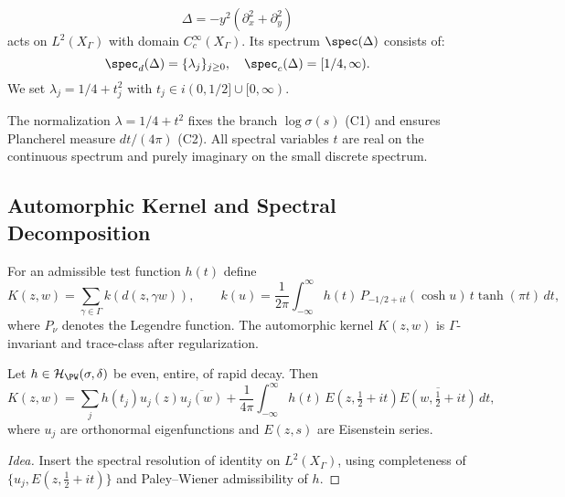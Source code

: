 \begin{definition}\label{def:laplace}\relax
\[
\Delta=-y^2(\partial_x^2+\partial_y^2)
\]
acts on $L^2(X_\Gamma)$ with domain $C_c^\infty(X_\Gamma)$.  
Its spectrum $\spec(\Delta)$ consists of:
\[
\spec_d(\Delta)=\{\lambda_j\}_{j\ge0},\quad \spec_c(\Delta)=[1/4,\infty).
\]
We set $\lambda_j=1/4+t_j^2$ with $t_j\in i(0,1/2]\cup[0,\infty)$. %
\end{definition}

\begin{remark}\label{rem:normalization}\relax
The normalization $\lambda=1/4+t^2$ fixes the branch $\log\sigma(s)$ (C1) and ensures Plancherel measure $dt/(4\pi)$ (C2).  
All spectral variables $t$ are real on the continuous spectrum and purely imaginary on the small discrete spectrum. %
\end{remark}

\subsection{Automorphic Kernel and Spectral Decomposition}\relax\hspace{0pt}
\label{subsec:kernel}\relax\hspace{0pt}

\begin{definition}\label{def:kernel}\relax
For an admissible test function $h(t)$ define
\[
K(z,w)=\sum_{\gamma\in\Gamma}k(d(z,\gamma w)), \qquad 
k(u)=\frac{1}{2\pi}\int_{-\infty}^{\infty} h(t)\,P_{-1/2+it}(\cosh u)\,t\tanh(\pi t)\,dt,
\]
where $P_\nu$ denotes the Legendre function.  
The automorphic kernel $K(z,w)$ is $\Gamma$-invariant and trace-class after regularization. %
\end{definition}

\begin{lemma}\label{lem:spectral-expansion}\relax
Let $h\in\mathcal{H}_{\PW}(\sigma,\delta)$ be even, entire, of rapid decay. Then
\[
K(z,w)=\sum_j h(t_j)u_j(z)\overline{u_j(w)}
+\frac{1}{4\pi}\int_{-\infty}^{\infty} h(t)\,E(z,\tfrac12+it)\overline{E(w,\tfrac12+it)}\,dt,
\]
where $u_j$ are orthonormal eigenfunctions and $E(z,s)$ are Eisenstein series. %
\end{lemma}

\begin{proof}[Idea]\relax
Insert the spectral resolution of identity on $L^2(X_\Gamma)$, using completeness of $\{u_j,E(z,\tfrac12+it)\}$ and Paley–Wiener admissibility of $h$. %
\end{proof}


